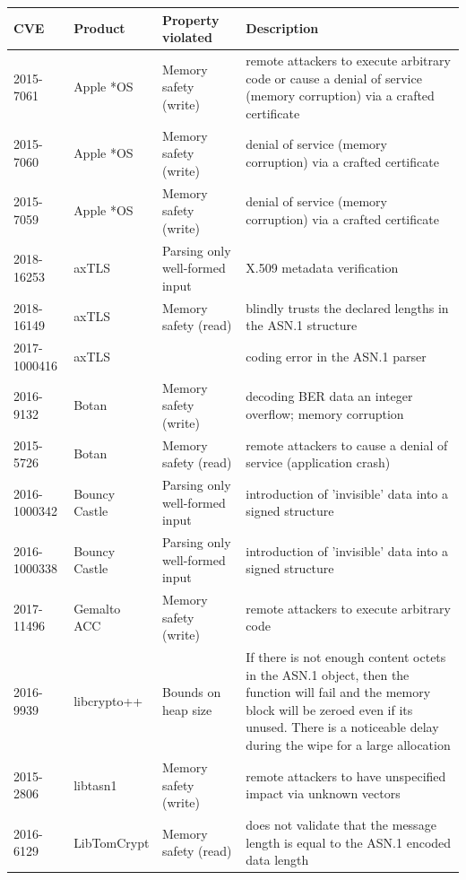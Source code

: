 \documentclass[10p,conference]{IEEEtran}
\begin{document}
\scriptsize
\begin{longtable}{ l l l p{25em} }
 
  {\bf CVE } &  {\bf Product  } &  {\bf Property violated  }  &  {\bf Description  } \\

  \hline

2015-7061    & Apple *OS     & Memory safety (write) & remote attackers to execute arbitrary code or cause a denial of service (memory corruption) via a crafted certificate \\  
2015-7060    & Apple *OS     & Memory safety (write) & denial of service (memory corruption) via a crafted certificate \\  
2015-7059    & Apple *OS     & Memory safety (write) & denial of service (memory corruption) via a crafted certificate \\  
2018-16253   & axTLS         & Parsing only well-formed input & X.509 metadata verification \\ 
2018-16149   & axTLS         & Memory safety (read) & blindly trusts the declared lengths in the ASN.1 structure \\ 
2017-1000416 & axTLS         &  & coding error in the ASN.1 parser \\ 
2016-9132    & Botan         & Memory safety (write) & decoding BER data an integer overflow; memory corruption \\ 
2015-5726    & Botan         & Memory safety (read) & remote attackers to cause a denial of service (application crash) \\ 
2016-1000342 & Bouncy Castle & Parsing only well-formed input & introduction of 'invisible' data into a signed structure \\ 
2016-1000338 & Bouncy Castle & Parsing only well-formed input & introduction of 'invisible' data into a signed structure \\ 
2017-11496   & Gemalto ACC   & Memory safety (write) & remote attackers to execute arbitrary code \\ 
2016-9939    & libcrypto++   & Bounds on heap size & If there is not enough content octets in the ASN.1 object, then the function will fail and the memory block will be zeroed even if its unused. There is a noticeable delay during the wipe for a large allocation \\ 
2015-2806    & libtasn1      & Memory safety (write) & remote attackers to have unspecified impact via unknown vectors \\
2016-6129    & LibTomCrypt   & Memory safety (read) & does not validate that the message length is equal to the ASN.1 encoded data length \\

\end{longtable}
\end{document}
